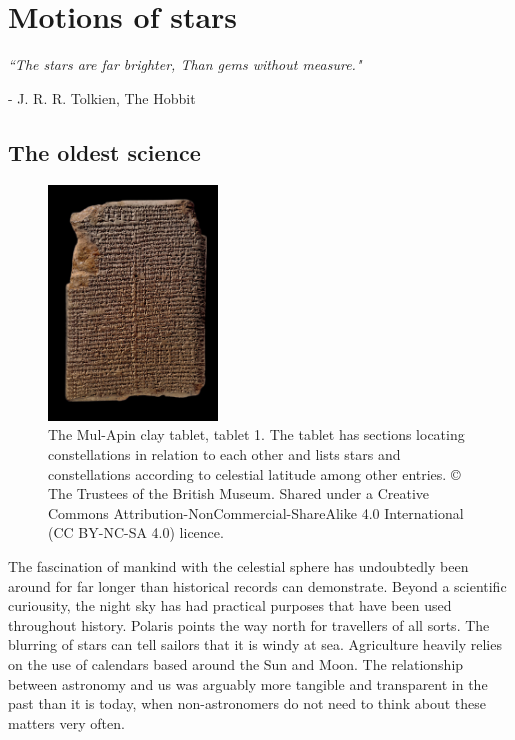 \chapter{Motions of stars}\label{chap:motions}
\begin{flushright}
\textit{``The stars are far brighter, Than gems without measure."}

- J. R. R. Tolkien, The Hobbit
\end{flushright}
\section{The oldest science}\label{sec:oldest}
\begin{figure}[t]
    \centering
    \includegraphics[width=0.4\textwidth]{images/tablet.jpeg}
    \caption{The Mul-Apin clay tablet, tablet 1. The tablet has sections locating constellations in relation to each other and lists stars and constellations according to celestial latitude among other entries. © The Trustees of the British Museum. Shared under a Creative Commons Attribution-NonCommercial-ShareAlike 4.0 International (CC BY-NC-SA 4.0) licence.} %
    \label{fig:tablet}
\end{figure}
The fascination of mankind with the celestial sphere has undoubtedly been around for far longer than historical records can demonstrate. Beyond a scientific curiousity, the night sky has had practical purposes that have been used throughout history. Polaris points the way north for travellers of all sorts. The blurring of stars can tell sailors that it is windy at sea. Agriculture heavily relies on the use of calendars based around the Sun and Moon. The relationship between astronomy and us was arguably more tangible and transparent in the past than it is today, when non-astronomers do not need to think about these matters very often. 

